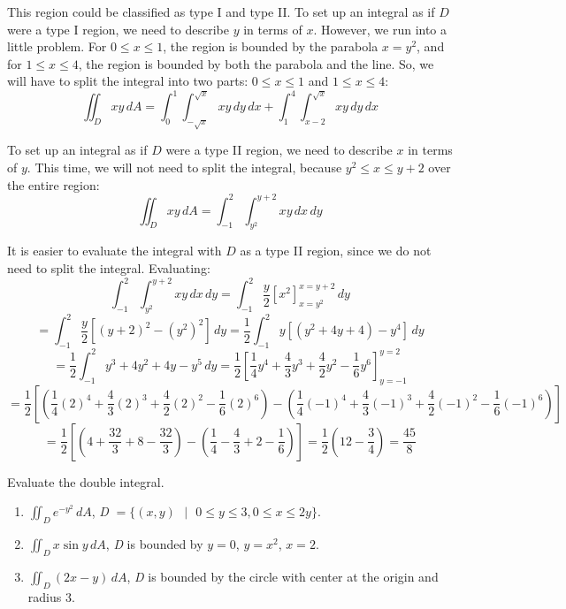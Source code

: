 \begin{Worked}
\begin{Solution}
This region could be classified as type I and type II. To set up an integral 
as if $D$ were a type I region, we need to describe $y$ in terms of $x$. 
However, we run into a little problem. For $0 \leq x \leq 1$, the region is 
bounded by the parabola $x = y^2$, and for $1 \leq x \leq 4$, the region is 
bounded by both the parabola and the line. So, we will have to split the 
integral into two parts: $0 \leq x \leq 1$ and $1 \leq x \leq 4$:
$$\iint_{D} xy\,dA = \int_0^1 \int_{-\sqrt{x}}^{\sqrt{x}} xy\,dy\,dx + \int_1^4 
\int_{x - 2}^{\sqrt{x}} xy\,dy\,dx$$

To set up an integral as if $D$ were a type II region, we need to describe $x$ 
in terms of $y$. This time, we will not need to split the integral, because $y^2
\leq x \leq y + 2$ over the entire region:
$$\iint_{D} xy\,dA = \int_{-1}^2 \int_{y^2}^{y + 2} xy\,dx\,dy$$

It is easier to evaluate the integral with $D$ as a type II region, since we 
do not need to split the integral. Evaluating:
$$\int_{-1}^2 \int_{y^2}^{y + 2} xy\,dx\,dy =\int_{-1}^2 \frac{y}{2} \left[ 
x^2 \right]_{x = y^2}^{x = y + 2}\,dy$$
$$= \int_{-1}^2 \frac{y}{2} \left[ \left( y + 2 
\right)^2 - \left( y^2 \right)^2 \right]\,dy = \frac{1}{2} \int_{-1}^2 y \left[ \left( y^2 + 4y
+ 4 \right) - y^4 \right]\,dy$$
$$= \frac{1}{2} \int_{-1}^2 y^3 + 4y^2 + 4y - y^5\,dy = \frac{1}{2} \left[ 
\frac{1}{4}y^4 + \frac{4}{3}y^3 + \frac{4}{2}y^2 - \frac{1}{6}y^6 \right]_{
y = -1}^{y = 2}$$
$$= \frac{1}{2} \left[ \left( \frac{1}{4} (2)^4 + \frac{4}{3} (2)^3 + \frac{4}{2} (2)^2 - \frac{1}{6} (2)^6 \right) - \left( \frac{1}{4} (-1)^4 + \frac{4}{3} (-1)^3 + \frac{4}{2} (-1)^2 - \frac{1}{6} (-1)^6 \right) \right]$$
$$= \frac{1}{2} \left[ \left( 4 + \frac{32}{3} + 8 - \frac{32}{3} \right) - \left( \frac{1}{4} - \frac{4}{3} + 2 - \frac{1}{6} \right) \right] = \frac{1}{2} \left( 12 - \frac{3}{4} \right) = \frac{45}{8}$$
\end{Solution}
\end{Worked}

\begin{Exercise}[title = {Double Integrals over Non-Rectangular Regions}, 
label = non-rect]
Evaluate the double integral.
\begin{enumerate}
\item $\iint_{\textit{D}} e^{-y^2} \,dA$, \textit{D} $= \{(x, y) \text{ } | 
\text{ } 0 \leq y \leq 3, 0 \leq x \leq 2y \}$.
\item $\iint_{\textit{D}} x \sin{y}\,dA$, \textit{D} is bounded by $y = 0$, 
$y = x^2$, $x = 2$. 
\item $\iint_{\textit{D}} \left(2x - y \right)\,dA$, \textit{D} is bounded by 
the circle with center at the origin and radius 3. 
\end{enumerate}
\vspace{75mm}
\end{Exercise}

